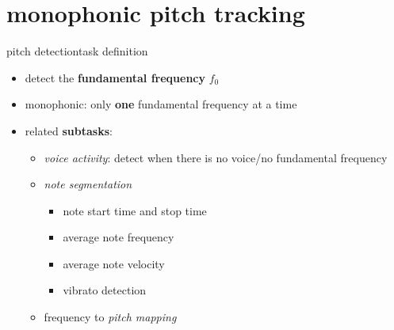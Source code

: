     \section[mono f0]{monophonic pitch tracking}
        \begin{frame}{pitch detection}{task definition}
            \begin{itemize}
                \item   detect the \textbf{fundamental frequency} $f_0$
                \item   monophonic: only \textbf{one} fundamental frequency at a time
                \bigskip
                \item   related \textbf{subtasks}:
                    \begin{itemize}
                        \item   \textit{voice activity}: detect when there is no voice/no fundamental frequency
                        \item   \textit{note segmentation}
                            \begin{itemize}
                                \item   note start time and stop time
                                \item   average note frequency
                                \item   average note velocity
                                \item   vibrato detection
                            \end{itemize}
                        \item   frequency to \textit{pitch mapping}
                    \end{itemize}
            \end{itemize}
        \end{frame}

